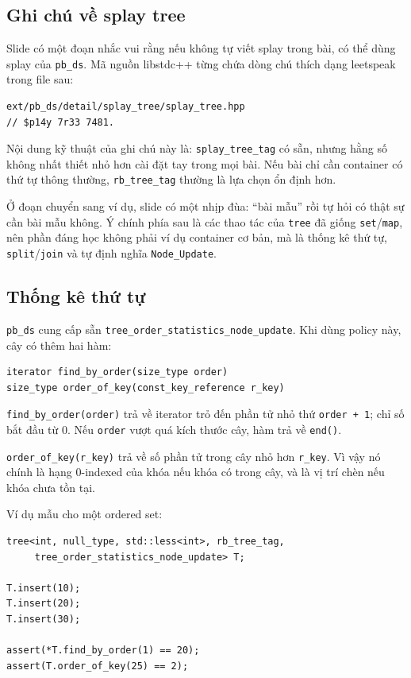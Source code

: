 \documentclass[11pt]{article}
\begin{document}
\subsection{Ghi chú về splay tree}

Slide có một đoạn nhắc vui rằng nếu không tự viết splay trong bài, có thể dùng
splay của \texttt{pb\_ds}. Mã nguồn libstdc++ từng chứa dòng chú thích dạng
leetspeak trong file sau:

\begin{verbatim}
ext/pb_ds/detail/splay_tree/splay_tree.hpp
// $p14y 7r33 7481.
\end{verbatim}

Nội dung kỹ thuật của ghi chú này là: \texttt{splay\_tree\_tag} có sẵn, nhưng
hằng số không nhất thiết nhỏ hơn cài đặt tay trong mọi bài. Nếu bài chỉ cần
container có thứ tự thông thường, \texttt{rb\_tree\_tag} thường là lựa chọn
ổn định hơn.

Ở đoạn chuyển sang ví dụ, slide có một nhịp đùa: ``bài mẫu'' rồi tự hỏi có
thật sự cần bài mẫu không. Ý chính phía sau là các thao tác của
\texttt{tree} đã giống \texttt{set}/\texttt{map}, nên phần đáng học không phải
ví dụ container cơ bản, mà là thống kê thứ tự, \texttt{split}/\texttt{join} và
tự định nghĩa \texttt{Node\_Update}.

\subsection{Thống kê thứ tự}

\texttt{pb\_ds} cung cấp sẵn
\texttt{tree\_order\_statistics\_node\_update}. Khi dùng policy này, cây có
thêm hai hàm:

\begingroup
\small
\begin{verbatim}
iterator find_by_order(size_type order)
size_type order_of_key(const_key_reference r_key)
\end{verbatim}
\endgroup

\texttt{find\_by\_order(order)} trả về iterator trỏ đến phần tử nhỏ thứ
\texttt{order + 1}; chỉ số bắt đầu từ $0$. Nếu \texttt{order} vượt quá kích
thước cây, hàm trả về \texttt{end()}.

\texttt{order\_of\_key(r\_key)} trả về số phần tử trong cây nhỏ hơn
\texttt{r\_key}. Vì vậy nó chính là hạng 0-indexed của khóa nếu khóa có trong
cây, và là vị trí chèn nếu khóa chưa tồn tại.

Ví dụ mẫu cho một ordered set:

\begingroup
\small
\begin{verbatim}
tree<int, null_type, std::less<int>, rb_tree_tag,
     tree_order_statistics_node_update> T;

T.insert(10);
T.insert(20);
T.insert(30);

assert(*T.find_by_order(1) == 20);
assert(T.order_of_key(25) == 2);
\end{verbatim}
\endgroup
\end{document}
